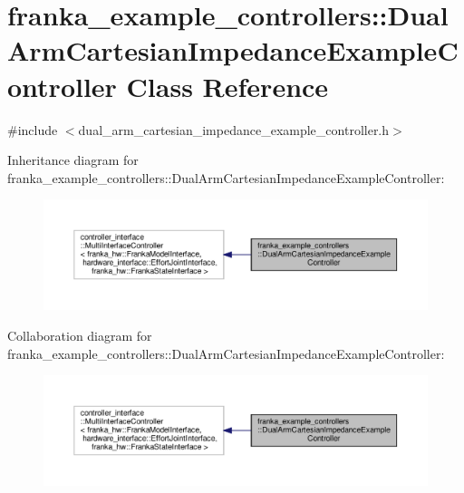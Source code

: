 \hypertarget{classfranka__example__controllers_1_1_dual_arm_cartesian_impedance_example_controller}{}\section{franka\+\_\+example\+\_\+controllers\+:\+:Dual\+Arm\+Cartesian\+Impedance\+Example\+Controller Class Reference}
\label{classfranka__example__controllers_1_1_dual_arm_cartesian_impedance_example_controller}


{\ttfamily \#include $<$dual\+\_\+arm\+\_\+cartesian\+\_\+impedance\+\_\+example\+\_\+controller.\+h$>$}



Inheritance diagram for franka\+\_\+example\+\_\+controllers\+:\+:Dual\+Arm\+Cartesian\+Impedance\+Example\+Controller\+:
\nopagebreak
\begin{figure}[H]
\begin{center}
\leavevmode
\includegraphics[width=350pt]{classfranka__example__controllers_1_1_dual_arm_cartesian_impedance_example_controller__inherit__graph}
\end{center}
\end{figure}


Collaboration diagram for franka\+\_\+example\+\_\+controllers\+:\+:Dual\+Arm\+Cartesian\+Impedance\+Example\+Controller\+:
\nopagebreak
\begin{figure}[H]
\begin{center}
\leavevmode
\includegraphics[width=350pt]{classfranka__example__controllers_1_1_dual_arm_cartesian_impedance_example_controller__coll__graph}
\end{center}
\end{figure}
